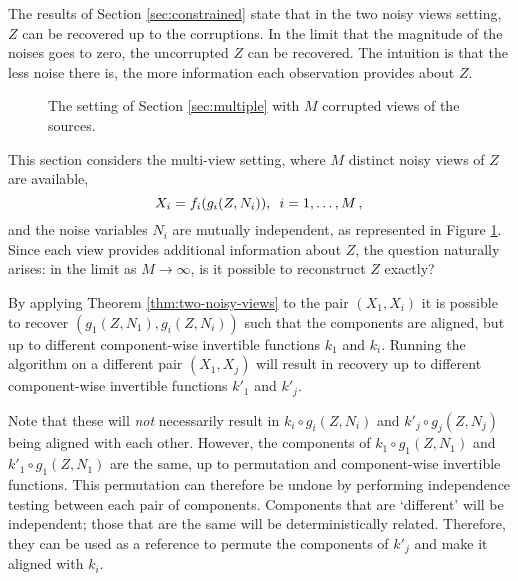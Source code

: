 The results of Section \ref{sec:constrained} state that in the two noisy views setting, $Z$ can be recovered up to the corruptions.
In the limit that the magnitude of the noises goes to zero, the uncorrupted $Z$ can be recovered.
The intuition is that the less noise there is, the more information each observation provides about $Z$.

\begin{figure}[t!]
	\centering
	\caption{The setting of Section \ref{sec:multiple} with $M$ corrupted views of the sources.}
	\label{fig:generalized_hsr_many}
\end{figure}

This section considers the multi-view setting, where $M$ distinct noisy views of $Z$ are available,
\begin{equation*}
X_{i}={f}_{i}({g}_{i}(Z,N_{i})),\,\,\,i=1, \ldots, M\,, \label{eq:multi}\\
\end{equation*}
and the noise variables $N_{i}$ are mutually independent, as represented in Figure \ref{fig:generalized_hsr_many}.
Since each view provides additional information about $Z$, the question naturally arises: in the limit as $M \to \infty$, is it possible to reconstruct $Z$ exactly?


By applying Theorem \ref{thm:two-noisy-views} to the pair $({X}_1,X_i)$ it is possible to recover  $({g}_1(Z,N_1),{g}_i(Z,N_i))$ such that the components are aligned, but up to different component-wise invertible functions ${k}_1$ and ${k}_i$.
Running the algorithm on a different pair  $({X}_1,X_{j})$ will result in recovery up to different component-wise invertible functions $k'_1$ and $k'_j$.

Note that these will \emph{not} necessarily result in  ${k}_i\circ{g}_i(Z,N_i)$ and ${k}'_j\circ{g}_j(Z,N_j)$ being aligned with each other.
However, the components of ${k}_1\circ{g}_1(Z,N_1)$ and ${k}'_1\circ{g}_1(Z,N_1)$ are the same, up to permutation and component-wise invertible functions.
This permutation can therefore be undone by performing independence testing between each pair of components.
Components that are `different' will be independent; those that are the same will be deterministically related.
Therefore, they can be used as a reference to permute the components of ${k}'_j$ and make it aligned with ${k}_i$.

